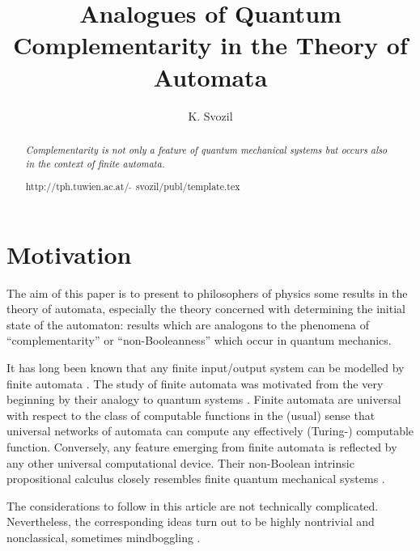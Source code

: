 \sloppy
\renewcommand{\floatpagefraction}{0.91}
\renewcommand{\baselinestretch}{2}




\begin{frontmatter}


\title{Analogues of Quantum Complementarity in the Theory of Automata}
\author{K. Svozil}
 \address{Institut f\"ur Theoretische Physik,
  University of Technology Vienna,
  Wiedner Hauptstra\ss e 8-10/136,
  A-1040 Vienna, Austria,
  e-mail: svozil@tph.tuwien.ac.at}


\begin{abstract}
{\em
Complementarity is not only a feature of quantum mechanical
systems but occurs also in the context of finite automata.}

\begin{flushright}
{\scriptsize
http://tph.tuwien.ac.at/$\widetilde{\;\;}\,$svozil/publ/template.tex}
\end{flushright}
\end{abstract}
\end{frontmatter}

\newpage

\section{Motivation}


The aim of this paper is to present to philosophers of physics some
results in the theory of automata, especially the theory concerned with
determining the initial state of the automaton: results which are
analogons to the phenomena of ``complementarity'' or ``non-Booleanness''
which occur in quantum mechanics.


It has long been known that any finite input/output system can be
modelled by finite automata \cite{paz}.
The study of finite automata was motivated from the very beginning
by their analogy to quantum systems
\cite{e-f-moore,Foulis-Randall,ran-foul-73}. Finite automata
are
universal with respect to the class of computable functions in the
(usual) sense that universal
networks of automata can compute any effectively (Turing-) computable
function. Conversely, any feature emerging from finite automata is
reflected by any other universal computational device.
Their non-Boolean intrinsic propositional calculus closely resembles
finite quantum mechanical systems
\cite{svozil-93,schaller-92,schaller-95,schaller-96,dvur-pul-svo}.

The considerations to follow in this article are not technically
complicated.
 Nevertheless,
the corresponding ideas turn out to be highly nontrivial
and nonclassical, sometimes mindboggling \cite{green-horn-zei}.


